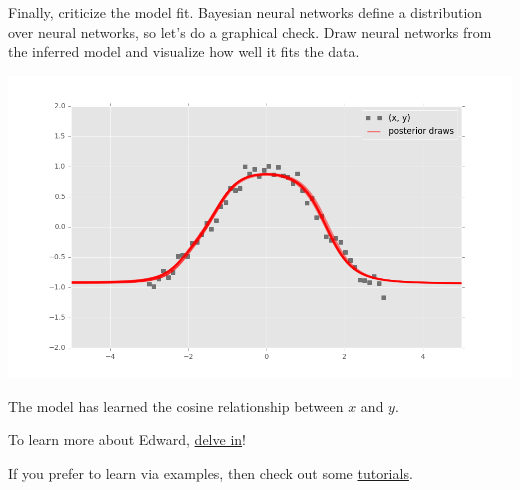 Finally, criticize the model fit. Bayesian neural networks define a
distribution over neural networks, so let's do a graphical check. Draw
neural networks from the inferred model and visualize how well it
fits the data.

\includegraphics[width=700px]{images/getting-started-fig1.png}

The model has learned the cosine relationship between $x$ and $y$.

To learn more about Edward, \href{delving-in.html}{delve in}!

If you prefer to learn via examples, then check out some
\href{tutorials.html}{tutorials}.
